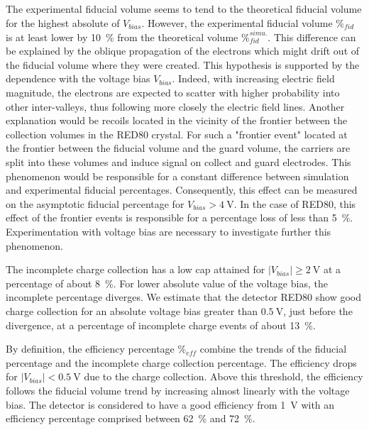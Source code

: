 The experimental fiducial volume seems to tend to the theoretical fiducial volume for the highest absolute of $V_{bias}$. However, the experimental fiducial volume $\%_{fid}$ is at least lower by \SI{10}{\percent} from the theoretical volume $\%_{fid}^{simu.}$. This difference can be explained by the oblique propagation of the electrons which might drift out of the fiducial volume where they were created. This hypothesis is supported by the dependence with the voltage bias $V_{bias}$. Indeed, with increasing electric field magnitude, the electrons are expected to scatter with higher probability into other inter-valleys, thus following more closely the electric field lines. Another explanation would be recoils located in the vicinity of the frontier between the collection volumes in the RED80 crystal. For such a "frontier event" located at the frontier between the fiducial volume and the guard volume, the carriers are split into these volumes and induce signal on collect and guard electrodes. This phenomenon would be responsible for a constant difference between simulation and experimental fiducial percentages. Consequently, this effect can be measured on the asymptotic fiducial percentage for $V_{bias} > \SI{4}{\volt}$. In the case of RED80, this effect of the frontier events is responsible for a percentage loss of less than \SI{5}{\percent}. Experimentation with voltage bias are necessary to investigate further this phenomenon.


The incomplete charge collection has a low cap attained for $| V_{bias} | \geq \SI{2}{\volt}$ at a percentage of about \SI{8}{\percent}. For lower absolute value of the voltage bias, the incomplete percentage diverges. We estimate that the detector RED80 show good charge collection for an absolute voltage bias greater than $\SI{0.5}{\volt}$, just before the divergence, at a percentage of incomplete charge events of about \SI{13}{\percent}.

By definition, the efficiency percentage $\%_{eff}$ combine the trends of the fiducial percentage and the incomplete charge collection percentage. The efficiency drops for $| V_{bias} | < \SI{0.5}{\volt}$ due to the charge collection. Above this threshold, the efficiency follows the fiducial volume trend by increasing almost linearly with the voltage bias. The detector is considered to have a good efficiency from \SI{1}{\volt} with an efficiency percentage comprised between \SI{62}{\percent} and \SI{72}{\percent}. 


